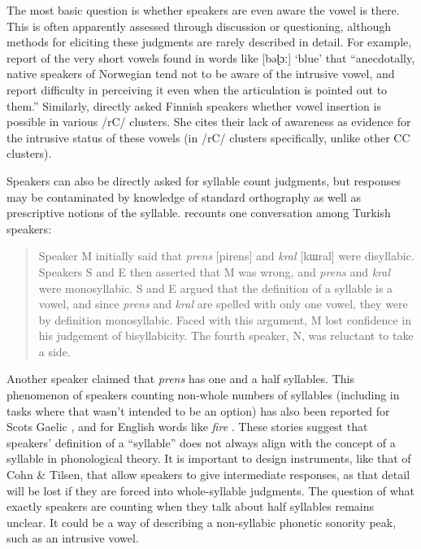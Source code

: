 \documentclass[output=paper,colorlinks,citecolor=brown]{langscibook}
\begin{document}
The most basic question is whether speakers are even aware the vowel is there. This is often apparently assessed through discussion or questioning, although methods for eliciting these judgments are rarely described in detail. For example, \citet{garmann2021cross} report of the very short vowels found in words like [bǝɭɔː] ‘blue’ that “anecdotally, native speakers of Norwegian tend not to be aware of the intrusive vowel, and report difficulty in perceiving it even when the articulation is pointed out to them.” Similarly, \citet{Karlin2021} directly asked Finnish speakers whether vowel insertion is possible in various /rC/ clusters. She cites their lack of awareness as evidence for the intrusive status of these vowels (in /rC/ clusters specifically, unlike other CC clusters). 

Speakers can also be directly asked for syllable count judgments, but responses may be contaminated by knowledge of standard orthography as well as prescriptive notions of the syllable. \citet[164]{Bellik2019a} recounts one conversation among Turkish speakers:

\begin{quote}
Speaker M initially said that \textit{prens} [pirens] and \textit{kral} [kɯral] were disyllabic. Speakers S and E then asserted that M was wrong, and \textit{prens} and \textit{kral} were monosyllabic. S and E argued that the definition of a syllable is a vowel, and since \textit{prens} and \textit{kral} are spelled with only one vowel, they were by definition monosyllabic. Faced with this argument, M lost confidence in his judgement of bisyllabicity. The fourth speaker, N, was reluctant to take a side. 
\end{quote}

Another speaker claimed that \textit{prens} has one and a half syllables. This phenomenon of speakers counting non-whole numbers of syllables (including in tasks where that wasn’t intended to be an option) has also been reported for Scots Gaelic \citep{hammond2014vowel}, and for English words like \textit{fire} \citep{cohn2015relation}. These stories suggest that speakers’ definition of a “syllable” does not always align with the concept of a syllable in phonological theory. It is important to design instruments, like that of Cohn \& Tilsen, that allow speakers to give intermediate responses, as that detail will be lost if they are forced into whole-syllable judgments. The question of what exactly speakers are counting when they talk about half syllables remains unclear. It could be a way of describing a non-syllabic phonetic sonority peak, such as an intrusive vowel. 
\end{document}
